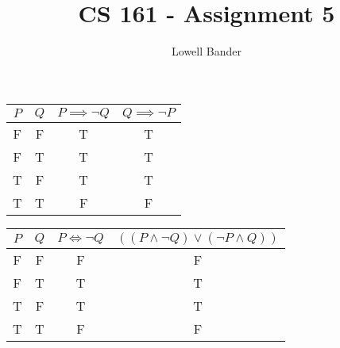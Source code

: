 \documentclass[]{article}
\begin{document}
\title{CS 161 - Assignment 5}
\author{Lowell Bander}
\maketitle

\section{}
\begin{table}[h]
\centering
\begin{tabular}{ c | c | c | c }
$P$ & $Q$ & $P \implies \neg Q$  & $Q \implies \neg P$ \\\hline
F & F & T & T\\
F & T & T & T\\
T & F & T & T\\
T & T & F & F\\
\end{tabular}
\end{table}

\begin{table}[h]
\centering
\begin{tabular}{ c | c | c | c }
$P$ & $Q$ & $P \iff \neg Q$  & $((P \land \neg Q) \lor (\neg P \land Q))$ \\\hline
F & F & F & F\\
F & T & T & T\\
T & F & T & T\\
T & T & F & F\\
\end{tabular}
\end{table}
\end{document}
